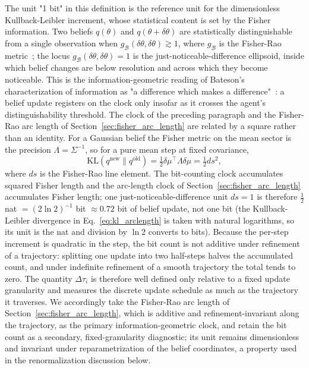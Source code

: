 \documentclass[11pt]{article}
\begin{document}
The unit "1 bit" in this definition is the reference unit for the dimensionless Kullback-Leibler increment, whose statistical content is set by the Fisher information. Two beliefs $q(\theta)$ and $q(\theta + \delta\theta)$ are statistically distinguishable from a single observation when $g_{\mathcal{B}}(\delta\theta, \delta\theta) \gtrsim 1$, where $g_{\mathcal{B}}$ is the Fisher-Rao metric~\cite{CoverThomas2006, AmariNagaoka2000}; the locus $g_{\mathcal{B}}(\delta\theta, \delta\theta) = 1$ is the just-noticeable-difference ellipsoid, inside which belief changes are below resolution and across which they become noticeable. This is the information-geometric reading of Bateson's characterization of information as "a difference which makes a difference"~\cite{Bateson1972}: a belief update registers on the clock only insofar as it crosses the agent's distinguishability threshold. The clock of the preceding paragraph and the Fisher-Rao arc length of Section~\ref{sec:fisher_arc_length} are related by a square rather than an identity. For a Gaussian belief the Fisher metric on the mean sector is the precision $\Lambda = \Sigma^{-1}$, so for a pure mean step at fixed covariance,
\begin{equation}
\mathrm{KL}(q^{\text{new}} \| q^{\text{old}}) = \tfrac{1}{2}\delta\mu^\top \Lambda \delta\mu = \tfrac{1}{2}ds^2,
\label{eq:kl_arclength}
\end{equation}
where $ds$ is the Fisher-Rao line element. The bit-counting clock accumulates squared Fisher length and the arc-length clock of Section~\ref{sec:fisher_arc_length} accumulates Fisher length; one just-noticeable-difference unit $ds = 1$ is therefore $\tfrac{1}{2}$ nat $= (2\ln 2)^{-1}$ bit $\approx 0.72$ bit of belief update, not one bit (the Kullback-Leibler divergence in Eq.~\eqref{eq:kl_arclength} is taken with natural logarithms, so its unit is the nat and division by $\ln 2$ converts to bits). Because the per-step increment is quadratic in the step, the bit count is not additive under refinement of a trajectory: splitting one update into two half-steps halves the accumulated count, and under indefinite refinement of a smooth trajectory the total tends to zero. The quantity $\Delta\tau_i$ is therefore well defined only relative to a fixed update granularity and measures the discrete update schedule as much as the trajectory it traverses. We accordingly take the Fisher-Rao arc length of Section~\ref{sec:fisher_arc_length}, which is additive and refinement-invariant along the trajectory, as the primary information-geometric clock, and retain the bit count as a secondary, fixed-granularity diagnostic; its unit remains dimensionless and invariant under reparametrization of the belief coordinates, a property used in the renormalization discussion below.
\end{document}
